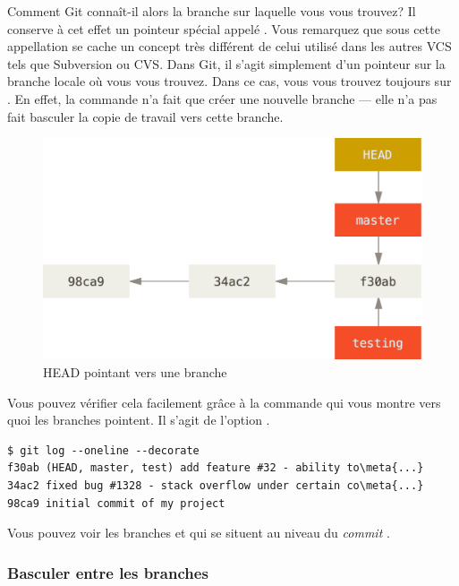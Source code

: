 Comment Git connaît-il alors la branche sur laquelle vous vous trouvez?
Il conserve à cet effet un pointeur spécial appelé .
Vous remarquez que sous cette appellation se cache un concept très différent de celui utilisé dans les autres VCS tels que Subversion ou CVS.
Dans Git, il s'agit simplement d'un pointeur sur la branche locale où vous vous trouvez.
Dans ce cas, vous vous trouvez toujours sur .
En effet, la commande  n'a fait que créer une nouvelle branche — elle n'a pas fait basculer la copie de travail vers cette branche.

\begin{figure}[!h]
  \centering
  \includegraphics{images/head-to-master}
  \caption{HEAD pointant vers une branche}
  \label{fig:git:head-to-master}
\end{figure}

Vous pouvez vérifier cela facilement grâce à la commande  qui vous montre vers quoi les branches pointent. Il s'agit de l'option .
\begin{Schunk}
\begin{Verbatim}[commandchars=\\\{\}]
$ git log --oneline --decorate
f30ab (HEAD, master, test) add feature #32 - ability to\meta{...}
34ac2 fixed bug #1328 - stack overflow under certain co\meta{...}
98ca9 initial commit of my project
\end{Verbatim}
\end{Schunk}

Vous pouvez voir les branches   et  qui se situent au niveau du \emph{commit} .

\subsubsection{Basculer entre les branches}
\label{sec:git:switching_branches}

